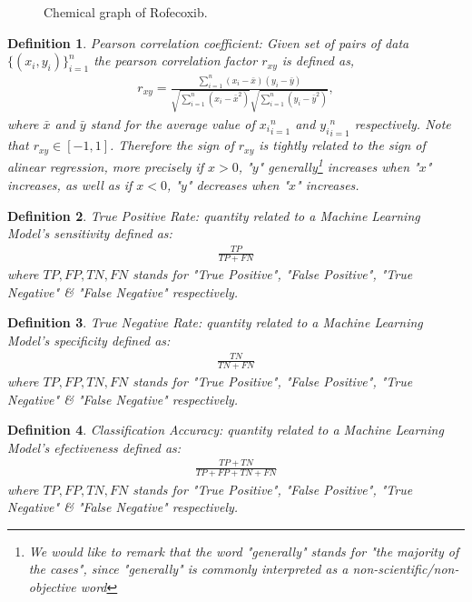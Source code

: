 \documentclass[11pt]{article}
\newtheorem{definition}{Definition}
\begin{document}
\begin{figure}[H]
\captionsetup{type=scheme}
\centering
{}
\caption{Chemical graph of Rofecoxib.}
\label{RofecoxibFigure}
\end{figure}
\begin{definition}\label{definitionPersonCoefficient}
Pearson correlation coefficient: Given set of pairs of data $\{(x_i,y_i)\}_{i=1}^n$ the pearson correlation factor $r_{xy}$ is defined as,
\begin{align}
r_{xy}=\frac{\sum_{i=1}^n(x_i-\bar{x})(y_i-\bar{y})}{\sqrt{\sum_{i=1}^n(x_i-\bar{x}^2)}\sqrt{\sum_{i=1}^n(y_i-\bar{y}^2)}},
\end{align}
where $\bar{x}$ and $\bar{y}$ stand for the average value of ${x_i}_{i=1}^n$ and ${y_i}_{i=1}^n$ respectively. Note that $r_{xy}\in[-1,1]$. Therefore the sign of $r_{xy}$ is tightly related to the sign of alinear regression, more precisely if $x>0$, "$y$" generally\footnote{We would like to remark that the word "generally" stands for "the majority of the cases", since "generally" is commonly interpreted as a non-scientific/non-objective word} increases when "$x$" increases, as well as if $x<0$, "$y$" decreases when "$x$" increases.
\end{definition}
\begin{definition}\label{definitionTruePositiveRate}
True Positive Rate: quantity related to a Machine Learning Model's sensitivity defined as:
\begin{align}
\frac{TP}{TP+FN}
\end{align}
where $TP,FP,TN,FN$ stands for "True Positive", "False Positive", "True Negative" \& "False Negative" respectively.
\end{definition}

\begin{definition}\label{definitionTrueNegativeRate}
True Negative Rate: quantity related to a Machine Learning Model's specificity defined as:
\begin{align}
\frac{TN}{TN+FN}
\end{align}
where $TP,FP,TN,FN$ stands for "True Positive", "False Positive", "True Negative" \& "False Negative" respectively.
\end{definition}

\begin{definition}\label{definitionClassificationAccuracy}
Classification Accuracy: quantity related to a Machine Learning Model's efectiveness defined as:
\begin{align}
\frac{TP+TN}{TP+FP+TN+FN}
\end{align}
where $TP,FP,TN,FN$ stands for "True Positive", "False Positive", "True Negative" \& "False Negative" respectively.
\end{definition}
\end{document}
